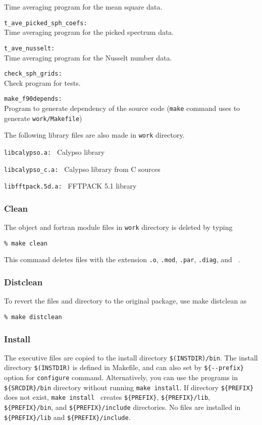 \begin{description}
 Time averaging program for the mean square data.
\item{\tt t\_ave\_picked\_sph\_coefs:     }\\
 Time averaging program for the picked spectrum data.
\item{\tt t\_ave\_nusselt:     }\\
Time averaging program for the Nusselt number data.
\item{\tt check\_sph\_grids:   }\\
                   Check program for tests.
\item{\tt make\_f90depends:  }\\
 Program to generate dependency of the source code ({\tt make} command uses to generate {\tt work/Makefile})
\end{description}
%
The following library files are also made in {\tt work} directory.
%
\begin{description}
\item{\tt libcalypso.a:    } Calypso library
\item{\tt libcalypso\_c.a:    } Calypso library from C sources
\item{\tt libfftpack.5d.a: } FFTPACK 5.1 library
\end{description}
%

\subsubsection{Clean}
The object and fortran module files in {\tt work} directory is deleted by typing
\begin{verbatim}
% make clean
\end{verbatim}
This command deletes files with the extension {\tt .o}, {\tt .mod}, {\tt .par}, {\tt .diag}, and {\tt ~}.

\subsubsection{Distclean}
To revert the files and directory to the original package, use make distclean as
\begin{verbatim}
% make distclean
\end{verbatim}

\subsubsection{Install}
 The executive files are copied to the install directory \verb|$(INSTDIR)/bin|. The install directory \verb|$(INSTDIR)| is defined in Makefile, and can also set by  \verb|${--prefix}| option for \verb|configure| command. Alternatively, you can use the programs in \verb|${SRCDIR}/bin| directory without running \verb|make install|. If directory \verb|${PREFIX}| does not exist, \verb|make install | creates  \verb|${PREFIX}|,  \verb|${PREFIX}/lib|,  \verb|${PREFIX}/bin|, and  \verb|${PREFIX}/include| directories. No files are installed in \verb|${PREFIX}/lib| and \verb|${PREFIX}/include|.

